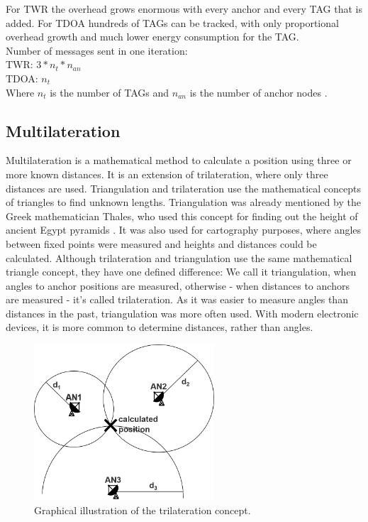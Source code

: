 \noindent\hspace*{5mm}%
For TWR the overhead grows enormous with every anchor and every TAG that is added. For TDOA hundreds of TAGs can be tracked, with only proportional overhead growth and much lower energy consumption for the TAG.\\
Number of messages sent in one iteration:\\
TWR:  $3 * n_{t} * n_{an}$\\
TDOA:  $n_{t}$\\
Where $n_{t}$ is the number of TAGs and $n_{an}$ is the number of anchor nodes \cite{SewioTDOA}.

\subsection{Multilateration}
Multilateration is a mathematical method to calculate a position using three or more known distances. It is an extension of trilateration, where only three distances are used. Triangulation and trilateration use the mathematical concepts of triangles to find unknown lengths. Triangulation was already mentioned by the Greek mathematician Thales, who used this concept for finding out the height of ancient Egypt pyramids \cite{thales}. It was also used for cartography purposes, where angles between fixed points were measured and heights and distances could be calculated. 
Although trilateration and triangulation use the same mathematical triangle concept, they have one defined difference: We call it triangulation, when angles to anchor positions are measured, otherwise - when distances to anchors are measured - it's called trilateration.
As it was easier to measure angles than distances in the past, triangulation was more often used. With modern electronic devices, it is more common to determine distances, rather than angles. 

\begin{figure}[th]
\centering
\includegraphics[width=0.6\textwidth]{Figures/trilateration}
\decoRule
\caption[Trilateration]{Graphical illustration of the trilateration concept.}
\label{fig:trilateration}
\end{figure}

